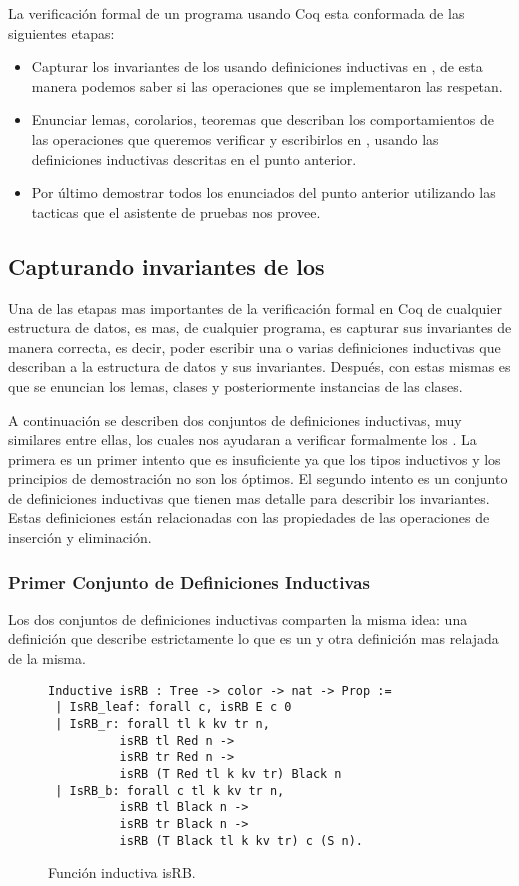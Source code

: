 La verificaci\'on formal de un programa usando Coq esta conformada de las siguientes etapas:
\begin{itemize}
    \item Capturar los invariantes de los {\arns} usando definiciones inductivas en {\coq}, de
    esta manera podemos saber si las operaciones que se implementaron las respetan.
    \item Enunciar lemas, corolarios, teoremas que describan los comportamientos de las
    operaciones que queremos verificar y escribirlos en {\coq}, usando las definiciones inductivas
    descritas en el punto anterior.
    \item Por \'ultimo demostrar todos los enunciados del punto anterior utilizando las tacticas
    que el asistente de pruebas nos provee.
\end{itemize}{}

\subsection{Capturando invariantes de los {\Arns}}
Una de las etapas mas importantes de la verificaci\'on formal en Coq de cualquier estructura de
datos, es mas, de cualquier programa, es capturar sus invariantes de manera correcta, es decir,
poder escribir una o varias definiciones inductivas que describan a la estructura de datos y sus
invariantes. Después, con estas mismas es que se enuncian los lemas, clases y posteriormente
instancias de las clases.

A continuaci\'on se describen dos conjuntos de definiciones inductivas, muy similares entre ellas,
los cuales nos ayudaran a verificar formalmente los {\arns}. La primera es un primer intento que es
insuficiente ya que los tipos inductivos y los principios de demostraci\'on no son los \'optimos.
El segundo intento es un conjunto de definiciones inductivas que tienen mas detalle para describir
los invariantes. Estas definiciones est\'an relacionadas con las propiedades de las operaciones de
inserci\'on y eliminaci\'on.

\subsubsection{Primer Conjunto de Definiciones Inductivas}
Los dos conjuntos de definiciones inductivas comparten la misma idea: una definici\'on que describe
estrictamente lo que es un {\arn} y otra definici\'on mas relajada de la misma.

\begin{figure}
\centering
\captionsetup{justification=centering}
\begin{verbatim}
Inductive isRB : Tree -> color -> nat -> Prop :=
 | IsRB_leaf: forall c, isRB E c 0
 | IsRB_r: forall tl k kv tr n,
          isRB tl Red n ->
          isRB tr Red n ->
          isRB (T Red tl k kv tr) Black n
 | IsRB_b: forall c tl k kv tr n,
          isRB tl Black n ->
          isRB tr Black n ->
          isRB (T Black tl k kv tr) c (S n).
\end{verbatim}
\caption{Funci\'on inductiva isRB.}
\label{inductive_isRB}
\end{figure}


